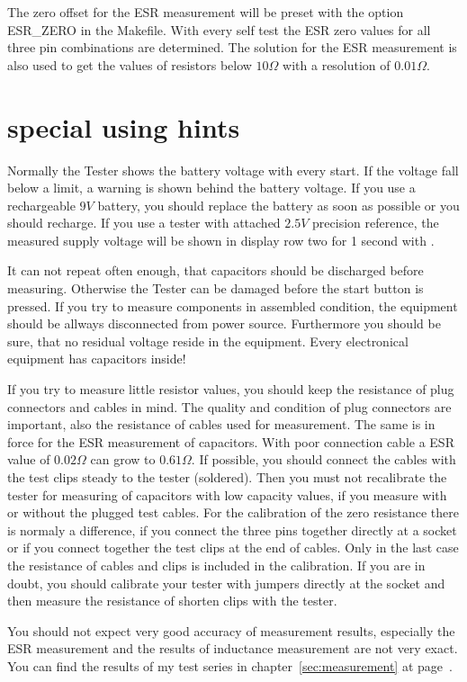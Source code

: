 The zero offset for the ESR measurement will be preset with the option ESR\_ZERO in the Makefile.
With every self test the ESR zero values for all three pin combinations are determined.
The solution for the ESR measurement is also used to get the values of resistors below \(10\Omega\) with
a resolution of \(0.01\Omega\).


\section{special using hints}
Normally the Tester shows the battery voltage with every start. If the voltage fall below a limit,
a warning is shown behind the battery voltage. If you use a rechargeable \(9V\) battery, you should replace
the battery as soon as possible or you should recharge.
If you use a tester with attached \(2.5V\) precision reference, the measured supply voltage will be shown
in display row two for 1 second with .

It can not repeat often enough, that capacitors should be discharged before measuring.
Otherwise the Tester can be damaged before the start button is pressed.
If you try to measure components in assembled condition, the equipment should be allways disconnected from power source.
Furthermore you should be sure, that no residual voltage reside in the equipment.
Every electronical equipment has capacitors inside!

If you try to measure little resistor values, you should keep the resistance of plug connectors and cables in mind.
The quality and condition of plug connectors are important, also the resistance of cables used for measurement.
The same is in force for the ESR measurement of capacitors.
With poor connection cable a ESR value of \(0.02\Omega\) can grow to \(0.61\Omega\).
If possible, you should connect the cables with the test clips steady to the tester (soldered).
Then you must not recalibrate the tester for measuring of capacitors with low capacity values,
if you measure with or without the plugged test cables. 
For the calibration of the zero resistance there is normaly a difference, if you connect the
three pins together directly at a socket or if you connect together the test clips at the end of cables.
Only in the last case the resistance of cables and clips is included in the calibration.
If you are in doubt, you should calibrate your tester with jumpers directly at the socket 
and then measure the resistance of shorten clips with the tester.

You should not expect very good accuracy of measurement results, especially the ESR measurement and the results of inductance measurement are not very exact.
You can find the results of my test series in chapter~\ref{sec:measurement} at page~\pageref{sec:measurement}.

